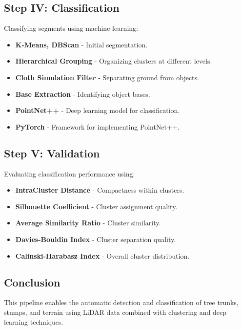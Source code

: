 \documentclass[../report.tex]{subfiles}
\begin{document}
\subsection{Step IV: Classification}
Classifying segments using machine learning:
\begin{itemize}
    \item \textbf{K-Means, DBScan} - Initial segmentation.
    \item \textbf{Hierarchical Grouping} - Organizing clusters at different levels.
    \item \textbf{Cloth Simulation Filter} - Separating ground from objects.
    \item \textbf{Base Extraction} - Identifying object bases.
    \item \textbf{PointNet++} - Deep learning model for classification.
    \item \textbf{PyTorch} - Framework for implementing PointNet++.
\end{itemize}

\subsection{Step V: Validation}
Evaluating classification performance using:
\begin{itemize}
    \item \textbf{IntraCluster Distance} - Compactness within clusters.
    \item \textbf{Silhouette Coefficient} - Cluster assignment quality.
    \item \textbf{Average Similarity Ratio} - Cluster similarity.
    \item \textbf{Davies-Bouldin Index} - Cluster separation quality.
    \item \textbf{Calinski-Harabasz Index} - Overall cluster distribution.
\end{itemize}

\subsection{Conclusion}
This pipeline enables the automatic detection and classification of tree trunks, stumps, and terrain using LiDAR data combined with clustering and deep learning techniques.
\end{document}
